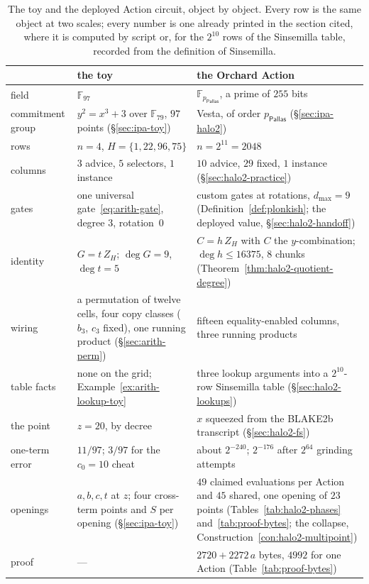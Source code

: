 \documentclass[11pt,a4paper]{article}
\theoremstyle{definition}
\newcommand{\F}{\mathbb{F}}
\newcommand{\Pallas}{\ensuremath{\mathsf{Pallas}}}
\newcommand{\ZH}{Z_H}
\begin{document}
\begin{table}[htbp]
\centering
\footnotesize
\setlength{\tabcolsep}{4pt}
\begin{tabular}{@{}l p{4.8cm} p{6.1cm}@{}}
\toprule
 & the toy & the Orchard Action \\
\midrule
field & $\F_{97}$ & $\F_{p_{\Pallas}}$, a prime of $255$ bits \\
commitment group & $y^2 = x^3 + 3$ over $\F_{79}$, $97$ points
  (\S\ref{sec:ipa-toy}) & Vesta, of order $p_{\Pallas}$
  (\S\ref{sec:ipa-halo2}) \\
rows & $n = 4$, $H = \{1, 22, 96, 75\}$ & $n = 2^{11} = 2048$ \\
columns & $3$ advice, $5$ selectors, $1$ instance & $10$ advice, $29$
  fixed, $1$ instance (\S\ref{sec:halo2-practice}) \\
gates & one universal gate~\eqref{eq:arith-gate}, degree $3$,
  rotation~$0$ & custom gates at rotations, $d_{\max} = 9$
  (Definition~\ref{def:plonkish}; the deployed value,
  \S\ref{sec:halo2-handoff}) \\
identity & $G = t\,\ZH$; $\deg G = 9$, $\deg t = 5$ & $C = h\,\ZH$
  with $C$ the $y$-combination; $\deg h \le 16375$, $8$ chunks
  (Theorem~\ref{thm:halo2-quotient-degree}) \\
wiring & a permutation of twelve cells, four copy classes ($b_3$, $c_3$
  fixed), one running product (\S\ref{sec:arith-perm}) & fifteen
  equality-enabled columns, three running products \\
table facts & none on the grid; Example~\ref{ex:arith-lookup-toy}
  & three lookup arguments into a $2^{10}$-row Sinsemilla table
  (\S\ref{sec:halo2-lookups}) \\
the point & $z = 20$, by decree & $x$ squeezed from the BLAKE2b
  transcript (\S\ref{sec:halo2-fs}) \\
one-term error & $11/97$; $3/97$ for the $c_0 = 10$ cheat & about
  $2^{-240}$; $2^{-176}$ after $2^{64}$ grinding attempts \\
openings & $a, b, c, t$ at $z$; four cross-term points and $S$ per
  opening (\S\ref{sec:ipa-toy}) & $49$ claimed evaluations per Action
  and $45$ shared, one opening of $23$ points
  (Tables~\ref{tab:halo2-phases} and~\ref{tab:proof-bytes}; the
  collapse, Construction~\ref{con:halo2-multipoint}) \\
proof & --- & $2720 + 2272\,a$ bytes, $4992$ for one Action
  (Table~\ref{tab:proof-bytes}) \\
\bottomrule
\end{tabular}
\caption{The toy and the deployed Action circuit, object by object.
Every row is the same object at two scales; every number is one
already printed in the section cited, where it is computed by script or,
for the $2^{10}$ rows of the Sinsemilla table, recorded from the
definition of Sinsemilla.}
\label{tab:verdict-scale}
\end{table}
\end{document}

